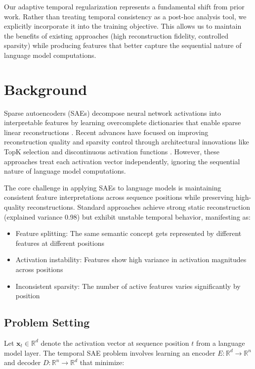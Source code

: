 \documentclass{article} %
\begin{document}
Our adaptive temporal regularization represents a fundamental shift from prior work. Rather than treating temporal consistency as a post-hoc analysis tool, we explicitly incorporate it into the training objective. This allows us to maintain the benefits of existing approaches (high reconstruction fidelity, controlled sparsity) while producing features that better capture the sequential nature of language model computations.

\section{Background}
\label{sec:background}

Sparse autoencoders (SAEs) decompose neural network activations into interpretable features by learning overcomplete dictionaries that enable sparse linear reconstructions \cite{gaoScalingEvaluatingSparse}. Recent advances have focused on improving reconstruction quality and sparsity control through architectural innovations like TopK selection \cite{bussmannBatchTopKSparseAutoencoders2024} and discontinuous activation functions \cite{rajamanoharanJumpingAheadImproving2024}. However, these approaches treat each activation vector independently, ignoring the sequential nature of language model computations.

The core challenge in applying SAEs to language models is maintaining consistent feature interpretations across sequence positions while preserving high-quality reconstructions. Standard approaches achieve strong static reconstruction (explained variance 0.98) but exhibit unstable temporal behavior, manifesting as:

\begin{itemize}
    \item Feature splitting: The same semantic concept gets represented by different features at different positions
    \item Activation instability: Features show high variance in activation magnitudes across positions
    \item Inconsistent sparsity: The number of active features varies significantly by position
\end{itemize}

\subsection{Problem Setting}
\label{subsec:problem}

Let $\mathbf{x}_t \in \mathbb{R}^d$ denote the activation vector at sequence position $t$ from a language model layer. The temporal SAE problem involves learning an encoder $E: \mathbb{R}^d \rightarrow \mathbb{R}^n$ and decoder $D: \mathbb{R}^n \rightarrow \mathbb{R}^d$ that minimize:
\end{document}
